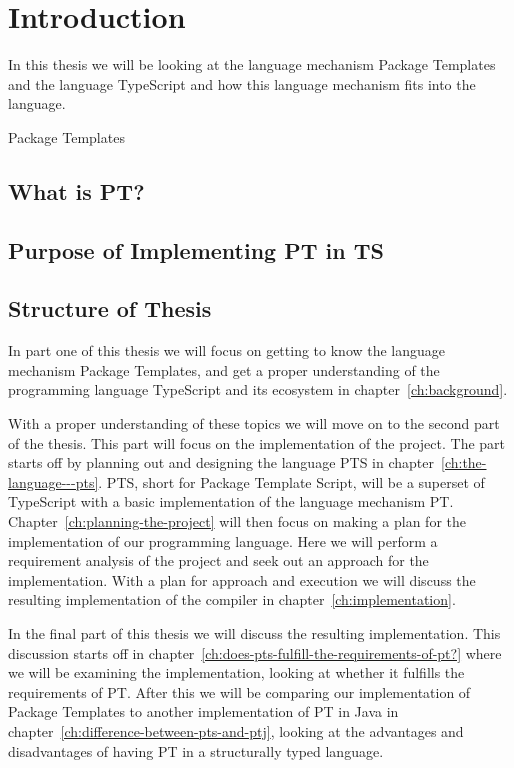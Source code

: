 
\chapter{Introduction}\label{ch:introduction}

In this thesis we will be looking at the language mechanism Package Templates and the language TypeScript and how this language mechanism fits into the language.

Package Templates

\section{What is PT?}\label{sec:what-is-pt?}


\section{Purpose of Implementing PT in TS}\label{sec:purpose-of-implementing-pt-in-ts}


\section{Structure of Thesis}\label{sec:structure-of-thesis}

In part one of this thesis we will focus on getting to know the language mechanism Package Templates, and get a proper understanding of the programming language TypeScript and its ecosystem in chapter~\vref{ch:background}.

With a proper understanding of these topics we will move on to the second part of the thesis.
This part will focus on the implementation of the project.
The part starts off by planning out and designing the language PTS in chapter~\vref{ch:the-language---pts}.
PTS, short for Package Template Script, will be a superset of TypeScript with a basic implementation of the language mechanism PT.
Chapter~\vref{ch:planning-the-project} will then focus on making a plan for the implementation of our programming language.
Here we will perform a requirement analysis of the project and seek out an approach for the implementation.
With a plan for approach and execution we will discuss the resulting implementation of the compiler in chapter~\vref{ch:implementation}.

In the final part of this thesis we will discuss the resulting implementation.
This discussion starts off in chapter~\vref{ch:does-pts-fulfill-the-requirements-of-pt?} where we will be examining the implementation, looking at whether it fulfills the requirements of PT.
After this we will be comparing our implementation of Package Templates to another implementation of PT in Java in chapter~\vref{ch:difference-between-pts-and-ptj}, looking at the advantages and disadvantages of having PT in a structurally typed language.
